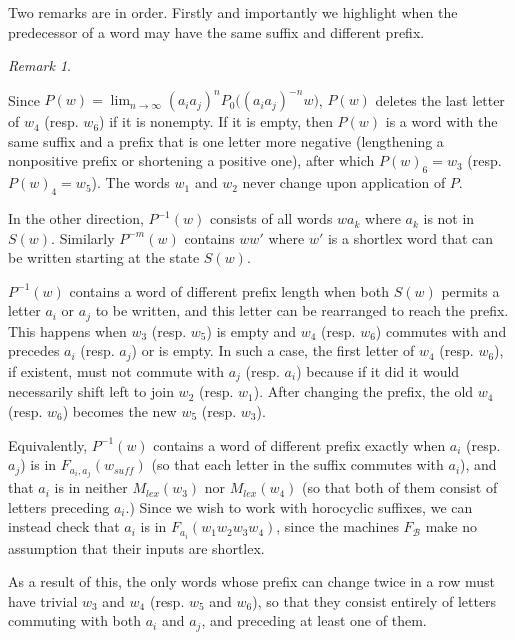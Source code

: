 \documentclass{amsart}
\theoremstyle{definition}
\theoremstyle{remark}
\newtheorem{remark}[theorem]{Remark}
\begin{document}
	Two remarks are in order. Firstly and importantly we highlight when the predecessor of a word may have the same suffix and different prefix.
	
	\begin{remark}\label{DescribingPredecessors}
		
		Since $P(w)=\lim_{n\to\infty} (a_ia_j)^nP_0\bigl( (a_ia_j)^{-n}w\bigr)$, $P(w)$ deletes the last letter of $w_4$ (resp. $w_6$) if it is nonempty. If it is empty, then $P(w)$ is a word with the same suffix and a prefix that is one letter more negative (lengthening a nonpositive prefix or shortening a positive one), after which $P(w)_6=w_3$ (resp. $P(w)_4=w_5$). The words $w_1$ and $w_2$ never change upon application of $P$.
		
		In the other direction, $P^{-1}(w)$ consists of all words $wa_k$ where $a_k$ is not in $S(w)$. Similarly $P^{-m}(w)$ contains $ww'$ where $w'$ is a shortlex word that can be written starting at the state $S(w)$. 
		
		$P^{-1}(w)$ contains a word of different prefix length when both $S(w)$ permits a letter $a_i$ or $a_j$ to be written, and this letter can be rearranged to reach the prefix. This happens when $w_3$ (resp. $w_5$) is empty and $w_4$ (resp. $w_6$) commutes with and precedes $a_i$ (resp. $a_j$) or is empty. In such a case, the first letter of $w_4$ (resp. $w_6$), if existent, must not commute with $a_j$ (resp. $a_i$) because if it did it would necessarily shift left to join $w_2$ (resp. $w_1$). After changing the prefix, the old $w_4$ (resp. $w_6$) becomes the new $w_5$ (resp. $w_3$).
		
		Equivalently, $P^{-1}(w)$ contains a word of different prefix exactly when $a_i$ (resp. $a_j$) is in $F_{a_i, a_j}(w_{suff})$ (so that each letter in the suffix commutes with $a_i$), and that $a_i$ is in neither $M_{lex}(w_3)$ nor $M_{lex}(w_4)$ (so that both of them consist of letters preceding $a_i$.) Since we wish to work with horocyclic suffixes, we can instead check that $a_i$ is in $F_{a_i}(w_1w_2w_3w_4)$, since the machines $F_\mathscr{B}$ make no assumption that their inputs are shortlex.
		
		As a result of this, the only words whose prefix can change twice in a row must have trivial $w_3$ and $w_4$ (resp. $w_5$ and $w_6$), so that they consist entirely of letters commuting with both $a_i$ and $a_j$, and preceding at least one of them.
		
	\end{remark}
	
\end{document}
